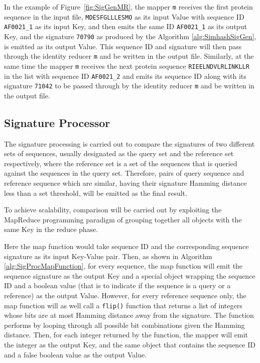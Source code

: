 \documentclass[titlepage]{csetr}
\begin{document}
In the example of Figure~\ref{fig:SigGenMR}, the mapper \texttt{m} receives the first protein sequence in the input file, \texttt{MDESFGLLLESMO} as its input Value with sequence ID \texttt{AF0021\_1} as its input Key, and then emits the same ID \texttt{AF0021\_1} as its output Key, and the signature \texttt{70790} as produced by the Algorithm \ref{alg:SimhashSigGen}, is emitted as its output Value. This sequence ID and signature will then pass through the identity reducer \texttt{m} and be written in the output file. Similarly, at the same time the mapper \texttt{m} receives the next protein sequence \texttt{RIEELNDVLRLINKLLR} in the list with sequence ID \texttt{AF0021\_2} and emits its sequence ID along with its signature \texttt{71042} to be passed through by the identity reducer \texttt{m} and be written in the output file.

\subsection{Signature Processor}
The signature processing is carried out to compare the signatures of two different sets of sequences, usually designated as the query set and the reference set respectively, where the reference set is a set of the sequences that is queried against the sequences in the query set. Therefore, pairs of query sequence and reference sequence which are similar, having their signature Hamming distance less than a set threshold, will be emitted as the final result.

To achieve scalability, comparison will be carried out by exploiting the MapReduce programming paradigm of grouping together all objects with the same Key in the reduce phase.

Here the map function would take sequence ID and the corresponding sequence signature as its input Key-Value pair. Then, as shown in Algorithm \ref{alg:SigProcMapFunction}, for every sequence, the map function will emit the sequence signature as the output Key and a special object wrapping the sequence ID and a boolean value (that is to indicate if the sequence is a query or a reference) as the output Value. However, for every reference sequence only, the map function will as well call a \texttt{flip()} function that returns a list of integers whose bits are at most  Hamming distance away from the signature. The function performs by looping through all possible bit combinations given the Hamming distance. Then, for each integer returned by the function, the mapper will emit the integer as the output Key, and the same object that contains the sequence ID and a false boolean value as the output Value. 
\end{document}

